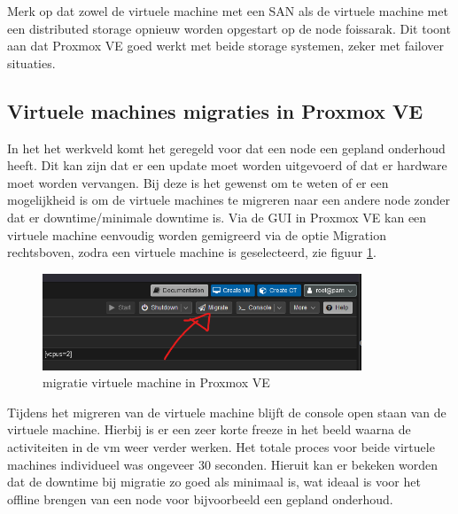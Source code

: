 Merk op dat zowel de virtuele machine met een SAN als de virtuele machine met een distributed storage opnieuw worden opgestart op de node foissarak. Dit toont aan dat Proxmox VE goed werkt met beide storage systemen, zeker met failover situaties.

\subsection{Virtuele machines migraties in Proxmox VE}
In het het werkveld komt het geregeld voor dat een node een gepland onderhoud heeft. Dit kan zijn dat er een update moet worden uitgevoerd of dat er hardware moet worden vervangen.
Bij deze is het gewenst om te weten of er een mogelijkheid is om de virtuele machines te migreren naar een andere node zonder dat er downtime/minimale downtime is.
Via de GUI in Proxmox VE kan een virtuele machine eenvoudig worden gemigreerd via de optie Migration rechtsboven, zodra een virtuele machine is geselecteerd, zie figuur \ref{fig:migratie-vm}.
\begin{figure}[H]
  \centering
  \includegraphics[width=0.85\textwidth]{../poc/vm-migratie-prox.png}
  \caption{migratie virtuele machine in Proxmox VE}
  \label{fig:migratie-vm}
\end{figure}
Tijdens het migreren van de virtuele machine blijft de console open staan van de virtuele machine. Hierbij is er een zeer korte freeze in het beeld waarna de activiteiten in de vm weer verder werken. Het totale proces voor beide virtuele machines individueel was ongeveer 30 seconden.
Hieruit kan er bekeken worden dat de downtime bij migratie zo goed als minimaal is, wat ideaal is voor het offline brengen van een node voor bijvoorbeeld een gepland onderhoud.

